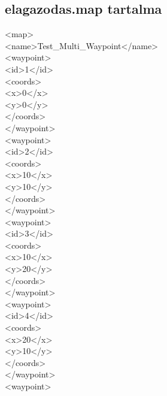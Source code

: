 \subsection{elagazodas.map tartalma}
<map>\\
\phantom{pina}<name>Test\_Multi\_Waypoint</name>\\
\phantom{pina}<waypoint>\\
\phantom{pina}\phantom{pina}<id>1</id>\\
\phantom{pina}\phantom{pina}<coords>\\
\phantom{pina}\phantom{pina}\phantom{pina}<x>0</x>\\
\phantom{pina}\phantom{pina}\phantom{pina}<y>0</y>\\
\phantom{pina}\phantom{pina}</coords>\\
\phantom{pina}</waypoint>\\
\phantom{pina}<waypoint>\\
\phantom{pina}\phantom{pina}<id>2</id>\\
\phantom{pina}\phantom{pina}<coords>\\
\phantom{pina}\phantom{pina}\phantom{pina}<x>10</x>\\
\phantom{pina}\phantom{pina}\phantom{pina}<y>10</y>\\
\phantom{pina}\phantom{pina}</coords>\\
\phantom{pina}</waypoint>\\
\phantom{pina}<waypoint>\\
\phantom{pina}\phantom{pina}<id>3</id>\\
\phantom{pina}\phantom{pina}<coords>\\
\phantom{pina}\phantom{pina}\phantom{pina}<x>10</x>\\
\phantom{pina}\phantom{pina}\phantom{pina}<y>20</y>\\
\phantom{pina}\phantom{pina}</coords>\\
\phantom{pina}</waypoint>\\
\phantom{pina}<waypoint>\\
\phantom{pina}\phantom{pina}<id>4</id>\\
\phantom{pina}\phantom{pina}<coords>\\
\phantom{pina}\phantom{pina}\phantom{pina}<x>20</x>\\
\phantom{pina}\phantom{pina}\phantom{pina}<y>10</y>\\
\phantom{pina}\phantom{pina}</coords>\\
\phantom{pina}</waypoint>\\
\phantom{pina}<waypoint>\\
